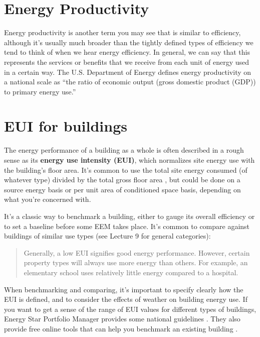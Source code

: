 \documentclass[10pt]{article}
\begin{document}
\section{Energy Productivity}

Energy productivity is another term you may see that is similar to efficiency, although it's usually much broader than the tightly defined types of efficiency we tend to think of when we hear energy efficiency. In general, we can say that this represents the services or benefits that we receive from each unit of energy used in a certain way. The U.S. Department of Energy defines energy productivity on a national scale as ``the ratio of economic output (gross
domestic product (GDP)) to primary energy use.'' \cite{energyproductivity}


\section{EUI for buildings}

The energy performance of a building as a whole is often described in a rough sense as its \textbf{energy use intensity (EUI)}, which normalizes site energy use with the building's floor area. It's common to use the total site energy consumed (of whatever type) divided by the total gross floor area \cite{noauthor_undated-vw}, but could be done on a source energy basis \cite{noauthor_undated-kb} or per unit area of conditioned space basis, depending on what you're concerned with.

It's a classic way to benchmark a building, either to gauge its overall efficiency or to set a baseline before some EEM takes place. It's common to compare against buildings of similar use types (see Lecture 9 for general categories):

\begin{quote}
    Generally, a low EUI signifies good energy performance. However, certain property types will always use more energy than others. For example, an elementary school uses relatively little energy compared to a hospital. \cite{noauthor_undated-vw}
\end{quote}

When benchmarking and comparing, it's important to specify clearly how the EUI is defined, and to consider the effects of weather on building energy use. If you want to get a sense of the range of EUI values for different types of buildings, Energy Star Portfolio Manager provides some national guidelines \cite{noauthor_2018-ho}. They also provide free online tools that can help you benchmark an existing building \cite{noauthor_undated-aw}.
\end{document}
